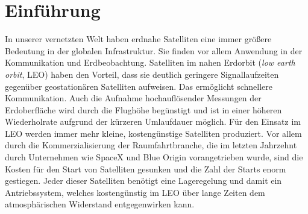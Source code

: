 \chapter{Einführung}
In unserer vernetzten Welt haben erdnahe Satelliten eine immer größere Bedeutung in der globalen Infrastruktur. Sie finden vor allem Anwendung in der Kommunikation und Erdbeobachtung. Satelliten im nahen Erdorbit (\textit{low earth orbit}, LEO) haben den Vorteil, dass sie deutlich geringere Signallaufzeiten gegenüber geostationären Satelliten aufweisen. Das ermöglicht schnellere Kommunikation. Auch die Aufnahme hochauflösender Messungen der Erdoberfläche wird durch die Flughöhe begünstigt und ist in einer höheren Wiederholrate aufgrund der kürzeren Umlaufdauer möglich. Für den Einsatz im LEO werden immer mehr kleine, kostengünstige Satelliten produziert. Vor allem durch die Kommerzialisierung der Raumfahrtbranche, die im letzten Jahrzehnt durch Unternehmen wie SpaceX und Blue Origin vorangetrieben wurde, sind die Kosten für den Start von Satelliten gesunken und die Zahl der Starts enorm gestiegen. Jeder dieser Satelliten benötigt eine Lageregelung und damit ein Antriebssystem, welches kostengünstig im LEO über lange Zeiten dem atmosphärischen Widerstand entgegenwirken kann.

